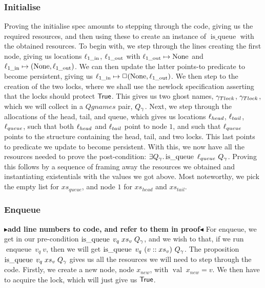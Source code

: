 \documentclass[twoside,11pt,openright]{report}
\newcommand{\enqueue}{\operatorname{enqueue}}
\newcommand{\isqueue}{\operatorname{is\_queue}}
\newcommand{\locin}[1]{\loc_{#1\_\text{in}}}
\newcommand{\locout}[1]{\loc_{#1\_\text{out}}}
\newcommand{\nVal}[1]{\operatorname{val} \; #1}
\newcommand{\todo}[1]{{\color[rgb]{.5,0,0}\textbf{$\blacktriangleright$#1$\blacktriangleleft$}}}
\begin{document}
\subsubsection{Initialise}
Proving the initialise spec amounts to stepping through the code, giving us the required resources, and then using these to create an instance of $\isqueue$ with the obtained resources. To begin with, we step through the lines creating the first node, giving us locations $\locin{1}$, $\locout{1}$ with $\locout{1} \mapsto \None$ and $\locin{1} \mapsto (\None, \locout{1})$. We can then update the latter points-to predicate to become persistent, giving us $\locin{1} \mapsto\persistently (\None, \locout{1})$. We then step to the creation of the two locks, where we shall use the newlock specification asserting that the locks should protect $\textsf{True}$. This gives us two ghost names, $\gamma_{Tlock}$, $\gamma_{Tlock}$, which we will collect in a $Qgnames$ pair, $Q_\gamma$.
Next, we step through the allocations of the head, tail, and queue, which gives us locations $\ell_{head}$, $\ell_{tail}$, $\ell_{queue}$, such that both $\ell_{head}$ and $\ell_{tail}$ point to node $1$, and such that $\ell_{queue}$ points to the structure containing the head, tail, and two locks. This last points to predicate we update to become persistent.
With this, we now have all the resources needed to prove the post-condition: $\exists Q_\gname . \isqueue \ \loc_{queue} \ Q_\gname$. Proving this follows by a sequence of framing away the resources we obtained and instantiating existentials with the values we got above. Most noteworthy, we pick the empty list for $xs_{queue}$, and node $1$ for $xs_{head}$ and $xs_{tail}$.


\subsubsection{Enqueue}
\todo{add line numbers to code, and refer to them in proof}
For enqueue, we get in our pre-condition $\isqueue \; v_q \; xs_v \; Q_\gname$, and we wish to that, if we run $\enqueue\ v_q\ v$, then we will get $\isqueue\ v_q\ (v :: xs_v)\ Q_\gname$. The proposition $\isqueue \; v_q \; xs_v \; Q_\gname$ gives us all the resources we will need to step through the code.
Firstly, we create a new node, node $x_{new}$, with $\nVal{x_{new}} = v$.
We then have to acquire the lock, which will just give us $\textsf{True}$.
\end{document}
